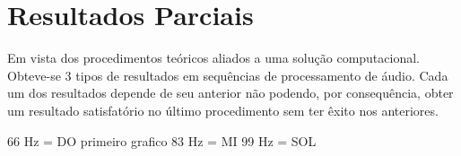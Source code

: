 \chapter{Resultados Parciais}
\label{sec:resultadosparciais}

	Em vista dos procedimentos teóricos aliados a uma solução computacional. Obteve-se 3 tipos de resultados em sequências de processamento de áudio.
	Cada um dos resultados depende de seu anterior não podendo, por consequência, obter um resultado satisfatório no último procedimento sem ter êxito nos anteriores.

	    

                     66 Hz = DO	
	primeiro grafico 83 Hz = MI
					 99 Hz = SOL

